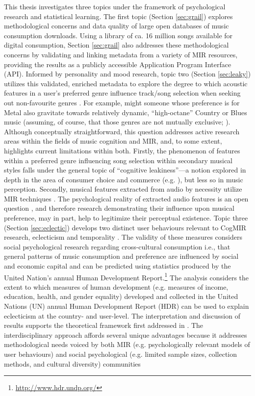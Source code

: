 \documentclass[a4paper]{article}
\begin{document}
This thesis investigates three topics under the framework of psychological research and statistical learning. The first topic (Section \ref{sec:grail}) explores methodological concerns and data quality of large open databases of music consumption downloads. Using a library of ca. 16 million songs available for digital consumption, Section \ref{sec:grail} also addresses these methodological concerns by validating and linking metadata from a variety of MIR resources, providing the results as a publicly accessible Application Program Interface (\Gls{API}). Informed by personality and mood research, topic two (Section \ref{sec:leaky}) utilizes this validated, enriched metadata to explore the degree to which acoustic features in a user's preferred genre influence track/song selection when seeking out non-favourite genres \cite{barone2017leaky}. For example, might someone whose preference is for Metal also gravitate towards relatively dynamic, “high-octane” Country or Blues music (assuming, of course, that those genres are not mutually exclusive; \cite{Woolhouse2015}){\color{red}.} Although conceptually straightforward, this question addresses active research areas within the fields of music cognition and MIR, and, to some extent, highlights current limitations within both. Firstly, the phenomenon of features within a preferred genre influencing song selection within secondary musical styles falls under the general topic of “cognitive leakiness”—a notion explored in depth in the area of consumer choice and commerce (e.g. \cite{rieskamp2006extending}), but less so in music perception. Secondly, musical features extracted from audio by necessity utilize MIR techniques \cite{lartillot2007matlab}. The psychological reality of extracted audio features is an open question \cite{friberg2014using}, and therefore research demonstrating their influence upon musical preference, may in part, help to legitimize their perceptual existence. Topic three (Section \ref{sec:eclectic}) develops two distinct user behaviours relevant to CogMIR research, eclecticism and temporality \cite{woolhouse2013work}. The validity of these measures considers social psychological research regarding cross-cultural consumption \cite{peterson1996changing,woolhouse2013work} i.e., that general patterns of music consumption and preference are influenced by social and economic capital and can be predicted using statistics produced by the United Nation's annual Human Development Report.\footnote{\url{http://www.hdr.undp.org/}} The analysis considers the extent to which measures of human development (e.g. measures of income, education, health, and gender equality) developed and collected in the United Nations (\Gls{UN}) annual Human Development Report (\Gls{HDR}) can be used to explain eclecticism at the country- and user-level. The interpretation and discussion of results supports the theoretical framework first addressed in \cite{peterson1996changing}. The interdisciplinary approach affords several unique advantages because it addresses methodological needs voiced by both MIR (e.g. psychologically relevant models of user behaviours) \cite{aucouturier2013seven,lee2004survey} and social psychological (e.g. limited sample sizes, collection methods, and cultural diversity) communities 
\end{document}
